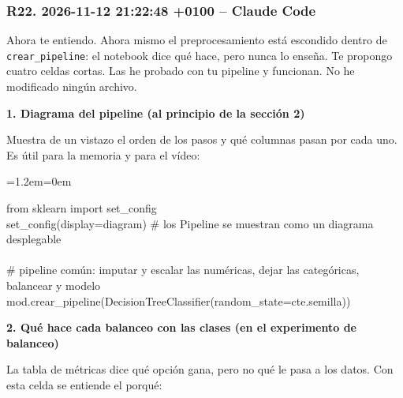 \documentclass[11pt,a4paper]{article}
\newenvironment{codigo}
  {\par\smallskip\begin{list}{}{\leftmargin=1.2em\rightmargin=0em}\item\relax\ttfamily\scriptsize\raggedright}
  {\end{list}\smallskip}
\begin{document}
\subsubsection*{R22. 2026-11-12 21:22:48 +0100 -- Claude Code}
{\small
Ahora te entiendo. Ahora mismo el preprocesamiento está escondido dentro de \texttt{crear\_\allowbreak{}pipeline}: el notebook dice qué hace, pero nunca lo enseña. Te propongo cuatro celdas cortas. Las he probado con tu pipeline y funcionan. No he modificado ningún archivo.

\smallskip\noindent\textbf{1. Diagrama del pipeline (al principio de la sección 2)}\par
Muestra de un vistazo el orden de los pasos y qué columnas pasan por cada uno. Es útil para la memoria y para el vídeo:

\begin{codigo}
from sklearn import set\_\allowbreak{}config \\{}
set\_\allowbreak{}config(display=\textquotedbl{}diagram\textquotedbl{})   \# los Pipeline se muestran como un diagrama desplegable \\{}
\mbox{} \\{}
\# pipeline común: imputar y escalar las numéricas, dejar las categóricas, balancear y modelo \\{}
mod.crear\_\allowbreak{}pipeline(DecisionTreeClassifier(random\_\allowbreak{}state=cte.semilla))
\end{codigo}
\smallskip\noindent\textbf{2. Qué hace cada balanceo con las clases (en el experimento de balanceo)}\par
La tabla de métricas dice qué opción gana, pero no qué le pasa a los datos. Con esta celda se entiende el porqué:

}
\end{document}
